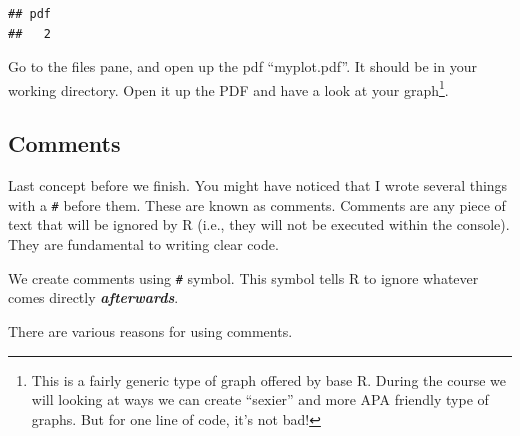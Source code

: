 \documentclass[
]{book}
\newenvironment{Shaded}{\begin{snugshade}}{\end{snugshade}}
\newcommand{\AttributeTok}[1]{\textcolor[rgb]{0.13,0.29,0.53}{#1}}
\newcommand{\CommentTok}[1]{\textcolor[rgb]{0.56,0.35,0.01}{\textit{#1}}}
\newcommand{\FunctionTok}[1]{\textcolor[rgb]{0.13,0.29,0.53}{\textbf{#1}}}
\newcommand{\NormalTok}[1]{#1}
\newcommand{\SpecialCharTok}[1]{\textcolor[rgb]{0.81,0.36,0.00}{\textbf{#1}}}
\newcommand{\StringTok}[1]{\textcolor[rgb]{0.31,0.60,0.02}{#1}}
\begin{document}
\begin{Shaded}
\end{Shaded}

\begin{verbatim}
## pdf 
##   2
\end{verbatim}

Go to the files pane, and open up the pdf ``myplot.pdf''. It should be in your working directory. Open it up the PDF and have a look at your graph\footnote{This is a fairly generic type of graph offered by base R. During the course we will looking at ways we can create ``sexier'' and more APA friendly type of graphs. But for one line of code, it's not bad!}.

\hypertarget{comments}{%
\subsection{Comments}\label{comments}}

Last concept before we finish. You might have noticed that I wrote several things with a \texttt{\#} before them. These are known as comments. Comments are any piece of text that will be ignored by R (i.e., they will not be executed within the console). They are fundamental to writing clear code.

We create comments using \texttt{\#} symbol. This symbol tells R to ignore whatever comes directly \textbf{\emph{afterwards}}.

There are various reasons for using comments.
\end{document}
